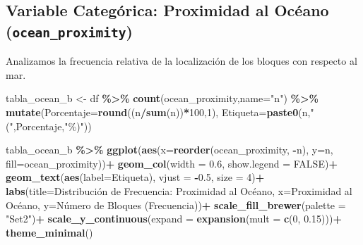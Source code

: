 \documentclass[
]{book}
\newenvironment{Shaded}{\begin{snugshade}}{\end{snugshade}}
\newcommand{\AttributeTok}[1]{\textcolor[rgb]{0.13,0.29,0.53}{#1}}
\newcommand{\ConstantTok}[1]{\textcolor[rgb]{0.56,0.35,0.01}{#1}}
\newcommand{\DecValTok}[1]{\textcolor[rgb]{0.00,0.00,0.81}{#1}}
\newcommand{\FloatTok}[1]{\textcolor[rgb]{0.00,0.00,0.81}{#1}}
\newcommand{\FunctionTok}[1]{\textcolor[rgb]{0.13,0.29,0.53}{\textbf{#1}}}
\newcommand{\NormalTok}[1]{#1}
\newcommand{\OtherTok}[1]{\textcolor[rgb]{0.56,0.35,0.01}{#1}}
\newcommand{\SpecialCharTok}[1]{\textcolor[rgb]{0.81,0.36,0.00}{\textbf{#1}}}
\newcommand{\StringTok}[1]{\textcolor[rgb]{0.31,0.60,0.02}{#1}}
\begin{document}
\subsection{\texorpdfstring{Variable Categórica: Proximidad al Océano (\texttt{ocean\_proximity})}{Variable Categórica: Proximidad al Océano (ocean\_proximity)}}\label{variable-categuxf3rica-proximidad-al-ocuxe9ano-ocean_proximity}

Analizamos la frecuencia relativa de la localización de los bloques con respecto al mar.

\begin{Shaded}
\begin{Highlighting}[]
\NormalTok{tabla\_ocean\_b }\OtherTok{\textless{}{-}}\NormalTok{ df }\SpecialCharTok{\%\textgreater{}\%}
  \FunctionTok{count}\NormalTok{(ocean\_proximity,}\AttributeTok{name=}\StringTok{"n"}\NormalTok{) }\SpecialCharTok{\%\textgreater{}\%}
  \FunctionTok{mutate}\NormalTok{(}\AttributeTok{Porcentaje=}\FunctionTok{round}\NormalTok{((n}\SpecialCharTok{/}\FunctionTok{sum}\NormalTok{(n))}\SpecialCharTok{*}\DecValTok{100}\NormalTok{,}\DecValTok{1}\NormalTok{),}
         \AttributeTok{Etiqueta=}\FunctionTok{paste0}\NormalTok{(n,}\StringTok{" ("}\NormalTok{,Porcentaje,}\StringTok{"\%)"}\NormalTok{))}

\NormalTok{tabla\_ocean\_b }\SpecialCharTok{\%\textgreater{}\%}
  \FunctionTok{ggplot}\NormalTok{(}\FunctionTok{aes}\NormalTok{(}\AttributeTok{x=}\FunctionTok{reorder}\NormalTok{(ocean\_proximity, }\SpecialCharTok{{-}}\NormalTok{n), }\AttributeTok{y=}\NormalTok{n, }\AttributeTok{fill=}\NormalTok{ocean\_proximity))}\SpecialCharTok{+}
  \FunctionTok{geom\_col}\NormalTok{(}\AttributeTok{width =} \FloatTok{0.6}\NormalTok{, }\AttributeTok{show.legend =} \ConstantTok{FALSE}\NormalTok{)}\SpecialCharTok{+}
  \FunctionTok{geom\_text}\NormalTok{(}\FunctionTok{aes}\NormalTok{(}\AttributeTok{label=}\NormalTok{Etiqueta), }\AttributeTok{vjust =} \SpecialCharTok{{-}}\FloatTok{0.5}\NormalTok{, }\AttributeTok{size =} \DecValTok{4}\NormalTok{)}\SpecialCharTok{+}
  \FunctionTok{labs}\NormalTok{(}\AttributeTok{title=}\StringTok{\textquotesingle{}Distribución de Frecuencia: Proximidad al Océano\textquotesingle{}}\NormalTok{,}
       \AttributeTok{x=}\StringTok{\textquotesingle{}Proximidad al Océano\textquotesingle{}}\NormalTok{,}
       \AttributeTok{y=}\StringTok{\textquotesingle{}Número de Bloques (Frecuencia)\textquotesingle{}}\NormalTok{)}\SpecialCharTok{+}
  \FunctionTok{scale\_fill\_brewer}\NormalTok{(}\AttributeTok{palette =} \StringTok{"Set2"}\NormalTok{)}\SpecialCharTok{+}
  \FunctionTok{scale\_y\_continuous}\NormalTok{(}\AttributeTok{expand =} \FunctionTok{expansion}\NormalTok{(}\AttributeTok{mult =} \FunctionTok{c}\NormalTok{(}\DecValTok{0}\NormalTok{, }\FloatTok{0.15}\NormalTok{)))}\SpecialCharTok{+}
  \FunctionTok{theme\_minimal}\NormalTok{()}
\end{Highlighting}
\end{Shaded}
\end{document}
